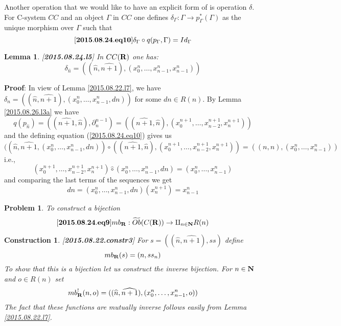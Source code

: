 \documentclass[11pt]{article}
\newenvironment{eq}{\begin{equation}}{\end{equation}}
\newenvironment{proof}{{\bf Proof}:}{\vskip 5mm }
\newtheorem{lemma}[proposition]{Lemma}
\newtheorem{problem}[proposition]{Problem}
\newtheorem{construction}[proposition]{Construction}
\newcommand{\llabel}[1]{\label{#1}[{\bf #1}]}
\newcommand{\sr}{\rightarrow}
\newcommand{\nn}{{\bf N\rm}}
\newcommand{\nat}{\nn}
\newcommand{\rr}{{\bf R}}
\newcommand{\wt}{\widetilde}
\newcommand{\wh}{\widehat}
\newcommand{\hc}{\wh{\circ}}
\begin{document}
%
Another operation that we would like to have an explicit form of is operation $\delta$. For C-system $CC$ and an object $\Gamma$ in $CC$ one defines $\delta_{\Gamma}:\Gamma\sr p_{\Gamma}^*(\Gamma)$ as the unique morphism over $\Gamma$ such that 
%
\begin{eq}\llabel{2015.08.24.eq10}
\delta_{\Gamma}\circ q(p_{\Gamma},\Gamma)=Id_{\Gamma}
\end{eq}
%
\begin{lemma}\llabel{2015.08.24.l5}
In $CC(\rr)$ one has: 
%
$$\delta_{\wh{n}}=((\wh{n},\wh{n+1}),(x_0^{n},\dots,x_{n-1}^{n},x_{n-1}^n))$$
%
\end{lemma}
%
\begin{proof}
In view of Lemma \ref{2015.08.22.l7}, we have $\delta_n=((\wh{n},\wh{n+1}),(x_0^{n},\dots,x_{n-1}^{n},dn))$ for some $dn\in R(n)$. By Lemma \ref{2015.08.26.l3a} we have
%
$$q(p_{\wh{n}})=((\wh{n+1},\wh{n}),\partial^{n-1}_{n})=((\wh{n+1},\wh{n}), (x_0^{n+1},\dots,x_{n-2}^{n+1},x_n^{n+1}))$$
%
and the defining equation (\ref{2015.08.24.eq10}) gives us
%
$$((\wh{n},\wh{n+1},(x_0^{n},\dots,x_{n-1}^{n},dn))\circ ((\wh{n+1},\wh{n}), (x_0^{n+1},\dots,x_{n-2}^{n+1},x_n^{n+1}))=((n,n),(x_0^n,\dots,x_{n-1}^n))$$
%
i.e.,
%
$$(x_0^{n+1},\dots,x_{n-2}^{n+1},x_n^{n+1})\hc (x_0^{n},\dots,x_{n-1}^{n},dn) =(x_0^n,\dots,x_{n-1}^n)$$
%
and comparing the last terms of the sequences we get
%
$$dn=(x_0^{n},\dots,x_{n-1}^{n},dn)(x_n^{n+1})=x_{n-1}^n$$
%
\end{proof}














%
\begin{problem}
To construct a bijection
%
\begin{eq}\llabel{2015.08.24.eq9}
mb_{\rr}:\wt{Ob}(C(\rr))\sr \amalg_{n\in\nat} R(n)
\end{eq}
%
\end{problem}
%
\begin{construction}\rm
\llabel{2015.08.22.constr3}
For $s=((\wh{n},\wh{n+1}),ss)$ define
%
$$mb_{\rr}(s)=(n,ss_n)$$
%
To show that this is a bijection let us construct the inverse bijection. For $n\in\nn$ and $o\in R(n)$ set
%
$$mb_{\rr}^!(n,o)=((\wh{n},\wh{n+1}),(x_0^n,\dots,x_{n-1}^n,o))$$
%
The fact that these functions are mutually inverse follows easily from Lemma \ref{2015.08.22.l7}.
\end{construction}
%
\end{document}
